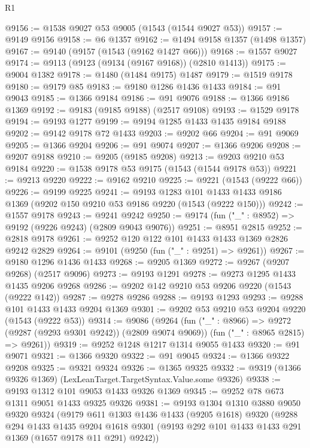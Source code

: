\begin{lexlean}{R1}
\begin{coremodule}
@9156 := @1538 @9027 @53 @9005 (@1543 (@1544 @9027 @53))
@9157 := @9149 @9156
@9158 := @6 @1357
@9162 := @1494 @9158 @1357 (@1498 @1357)
@9167 := @9140 (@9157 (@1543 (@9162 @1427 @66)))
@9168 := @1557 @9027
@9174 := @9113 (@9123 (@9134 (@9167 @9168)) (@2810 @1413))
@9175 := @9004 @1382
@9178 := @1480 (@1484 @9175) @1487
@9179 := @1519 @9178
@9180 := @9179 @85
@9183 := @9180 @1286 @1436 @1433
@9184 := @91 @9043
@9185 := @1366 @9184
@9186 := @91 @9076
@9188 := @1366 @9186 @1369
@9192 := @9183 (@9185 @9188) (@2517 @9108)
@9193 := @1529 @9178
@9194 := @9193 @1277
@9199 := @9194 @1285 @1433 @1435 @9184 @9188
@9202 := @9142 @9178 @72 @1433
@9203 := @9202 @66
@9204 := @91 @9069
@9205 := @1366 @9204
@9206 := @91 @9074
@9207 := @1366 @9206
@9208 := @9207 @9188
@9210 := @9205 (@9185 @9208)
@9213 := @9203 @9210 @53 @9184
@9220 := @1538 @9178 @53 @9175 (@1543 (@1544 @9178 @53))
@9221 := @9213 @9220
@9222 := @9162 @9210
@9225 := @9221 (@1543 (@9222 @66))
@9226 := @9199 @9225
@9241 := @9193
    @1283
    @101
    @1433
    @1433
    @9186
    @1369
    (@9202 @150 @9210 @53 @9186 @9220 (@1543 (@9222 @150)))
@9242 := @1557 @9178
@9243 := @9241 @9242
@9250 := @9174 (fun ("_" : @8952) => @9192 (@9226 @9243) (@2809 @9043 @9076))
@9251 := @8951 @2815
@9252 := @2818 @9178
@9261 := @9252 @120 @122 @101 @1433 @1433 @1369 @2826 @9242 @2829
@9264 := @9101 (@9250 (fun ("_" : @9251) => @9261))
@9267 := @9180 @1296 @1436 @1433
@9268 := @9205 @1369
@9272 := @9267 (@9207 @9268) (@2517 @9096)
@9273 := @9193 @1291
@9278 := @9273 @1295 @1433 @1435 @9206 @9268
@9286 := @9202 @142 @9210 @53 @9206 @9220 (@1543 (@9222 @142))
@9287 := @9278 @9286
@9288 := @9193 @1293
@9293 := @9288 @101 @1433 @1433 @9204 @1369
@9301 := @9202 @53 @9210 @53 @9204 @9220 (@1543 (@9222 @53))
@9314 := @9086
    (@9264
      (fun ("_" : @8966) => @9272 (@9287 (@9293 @9301 @9242)) (@2809 @9074 @9069))
      (fun ("_" : @8965 @2815) => @9261))
@9319 := @9252 @1248 @1217 @1314 @9055 @1433
@9320 := @91 @9071
@9321 := @1366 @9320
@9322 := @91 @9045
@9324 := @1366 @9322 @9208
@9325 := @9321 @9324
@9326 := @1365 @9325
@9332 := @9319 (@1366 @9326 @1369) (LexLeanTarget.TargetSyntax.Value.some @9326)
@9338 := @9193 @1312 @101 @9053 @1433 @9326 @1369
@9345 := @9252 @78 @673 @1311 @9051 @1433 @9325 @9326
@9381 := @9193
    @1304
    @1310
    @3880
    @9050
    @9320
    @9324
    (@9179
      @611
      @1303
      @1436
      @1433
      (@9205 @1618)
      @9320
      (@9288
        @294
        @1433
        @1435
        @9204
        @1618
        @9301
        (@9193 @292 @101 @1433 @1433 @291 @1369 (@1657 @9178 @11 @291) @9242))

\end{coremodule}
\end{lexlean}
